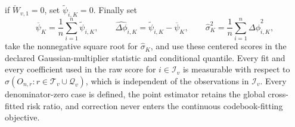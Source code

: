 if \(\check W_{v,1}=0\), set \(\widetilde\psi_{i,K}=0\).  Finally set
\[
 \overline\psi_K=\frac1n\sum_{i=1}^n\widetilde\psi_{i,K},\qquad
 \widehat{\Delta\phi}_{i,K}=\widetilde\psi_{i,K}-\overline\psi_K,\qquad
 \widehat\sigma_K^2=\frac1n\sum_{i=1}^n\widehat{\Delta\phi}_{i,K}^2,
\]
take the nonnegative square root for \(\widehat\sigma_K\), and use these centered scores in the declared Gaussian-multiplier statistic and conditional quantile.  Every fit and every coefficient used in the raw score for \(i\in\mathcal I_v\) is measurable with respect to \(\sigma(O_{n,r}:r\in\mathcal T_v\cup\mathcal Q_v)\), which is independent of the observations in \(\mathcal I_v\).  Every denominator-zero case is defined, the point estimator retains the global cross-fitted risk ratio, and correction never enters the continuous codebook-fitting objective.